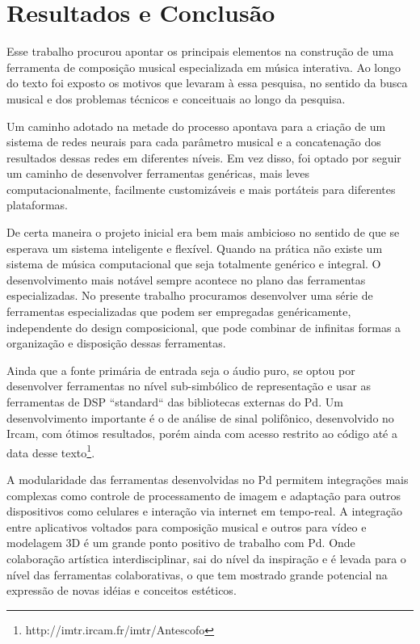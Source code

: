 \documentclass{ppgmus}
\begin{document}






\chapter{Resultados e Conclusão}
\label{sec:conclusao}



Esse trabalho procurou apontar os principais elementos na construção
de uma ferramenta de composição musical especializada em música 
interativa. Ao longo do texto foi exposto os motivos que levaram
à essa pesquisa, no sentido da busca musical e dos problemas
técnicos e conceituais ao longo da pesquisa.

 Um caminho adotado na metade do
processo apontava para a criação de um sistema de redes neurais 
para cada parâmetro musical e a concatenação dos resultados dessas redes
em diferentes níveis. Em vez disso, foi optado por seguir um caminho
de desenvolver ferramentas genéricas, mais leves computacionalmente,
facilmente customizáveis e mais portáteis para diferentes plataformas.

De certa maneira o projeto inicial era bem mais ambicioso no sentido
de que se esperava um sistema inteligente e flexível. 
Quando na prática
não existe um sistema de música computacional que seja totalmente genérico
e integral. O desenvolvimento mais notável sempre acontece no plano das ferramentas
especializadas. No presente trabalho procuramos desenvolver uma série
de ferramentas especializadas que podem ser empregadas genéricamente, independente
do design composicional, que pode combinar de infinitas formas a organização e 
disposição dessas ferramentas.  

Ainda que a fonte primária de entrada seja o áudio puro, se optou por
desenvolver ferramentas no nível sub-simbólico de representação e usar as ferramentas
de DSP ``standard`` das bibliotecas externas do Pd. Um desenvolvimento importante
é o de análise de sinal polifônico, desenvolvido no Ircam, com ótimos resultados,
porém ainda com acesso restrito
ao código até a data desse texto\footnote{http://imtr.ircam.fr/imtr/Antescofo}.    


A modularidade das ferramentas desenvolvidas no Pd permitem
integrações mais complexas como controle de  processamento de imagem
e adaptação para outros dispositivos como celulares e interação via internet
em tempo-real. A integração entre aplicativos voltados para composição musical
e outros para vídeo e modelagem 3D é um grande ponto positivo de trabalho com
Pd. Onde colaboração artística interdisciplinar, sai do nível da inspiração e é levada para 
o nível das ferramentas colaborativas, o que tem mostrado grande potencial na expressão
de novas idéias e conceitos estéticos.
\end{document}
